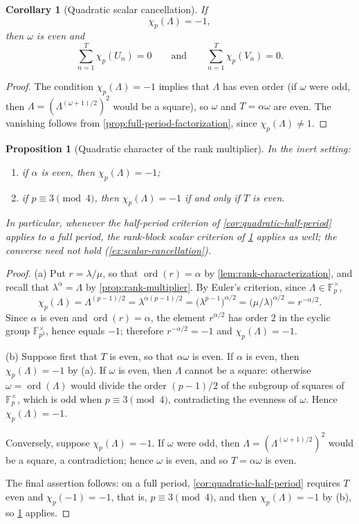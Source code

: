 \documentclass[11pt]{article}
\newcommand{\ord}{\operatorname{ord}}
\newcommand{\Fp}{\mathbb{F}_p}
\newcommand{\Fpq}{\mathbb{F}_{p^2}}
\newcommand{\chiP}{\chi_p}
\theoremstyle{plain}
\newtheorem{proposition}[theorem]{Proposition}
\newtheorem{corollary}[theorem]{Corollary}
\theoremstyle{definition}
\begin{document}
\begin{corollary}[Quadratic scalar cancellation]
\label{cor:quadratic-scalar}
If
\[
 \chiP(\Lambda)=-1,
\]
then $\omega$ is even and
\[
 \sum_{n=1}^{T}\chiP(U_n)=0
 \qquad\text{and}\qquad
 \sum_{n=1}^{T}\chiP(V_n)=0.
\]
\end{corollary}

\begin{proof}
The condition $\chiP(\Lambda)=-1$ implies that $\Lambda$ has even order (if $\omega$ were odd, then $\Lambda=(\Lambda^{(\omega+1)/2})^2$ would be a square), so $\omega$ and $T=\alpha\omega$ are even. The vanishing follows from \cref{prop:full-period-factorization}, since $\chiP(\Lambda)\neq1$.
\end{proof}

\begin{proposition}[Quadratic character of the rank multiplier]
\label{prop:chi-lambda}
In the inert setting:
\begin{enumerate}
 \item[(a)] if $\alpha$ is even, then $\chiP(\Lambda)=-1$;
 \item[(b)] if $p\equiv3\pmod4$, then $\chiP(\Lambda)=-1$ if and only if $T$ is even.
\end{enumerate}
In particular, whenever the half-period criterion of \cref{cor:quadratic-half-period} applies to a full period, the rank-block scalar criterion of \cref{cor:quadratic-scalar} applies as well; the converse need not hold (\cref{ex:scalar-cancellation}).
\end{proposition}

\begin{proof}
(a) Put $r=\lambda/\mu$, so that $\ord(r)=\alpha$ by \cref{lem:rank-characterization}, and recall that $\lambda^\alpha=\Lambda$ by \cref{prop:rank-multiplier}. By Euler's criterion, since $\Lambda\in\Fp^\times$,
\[
 \chiP(\Lambda)
 =\Lambda^{(p-1)/2}
 =\lambda^{\alpha(p-1)/2}
 =\bigl(\lambda^{p-1}\bigr)^{\alpha/2}
 =\bigl(\mu/\lambda\bigr)^{\alpha/2}
 =r^{-\alpha/2}.
\]
Since $\alpha$ is even and $\ord(r)=\alpha$, the element $r^{\alpha/2}$ has order $2$ in the cyclic group $\Fpq^\times$, hence equals $-1$; therefore $r^{-\alpha/2}=-1$ and $\chiP(\Lambda)=-1$.

(b) Suppose first that $T$ is even, so that $\alpha\omega$ is even. If $\alpha$ is even, then $\chiP(\Lambda)=-1$ by (a). If $\omega$ is even, then $\Lambda$ cannot be a square: otherwise $\omega=\ord(\Lambda)$ would divide the order $(p-1)/2$ of the subgroup of squares of $\Fp^\times$, which is odd when $p\equiv3\pmod4$, contradicting the evenness of $\omega$. Hence $\chiP(\Lambda)=-1$.

Conversely, suppose $\chiP(\Lambda)=-1$. If $\omega$ were odd, then $\Lambda=(\Lambda^{(\omega+1)/2})^2$ would be a square, a contradiction; hence $\omega$ is even, and so $T=\alpha\omega$ is even.

The final assertion follows: on a full period, \cref{cor:quadratic-half-period} requires $T$ even and $\chiP(-1)=-1$, that is, $p\equiv3\pmod4$, and then $\chiP(\Lambda)=-1$ by (b), so \cref{cor:quadratic-scalar} applies.
\end{proof}
\end{document}
